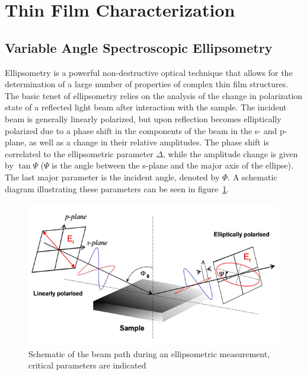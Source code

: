 





\section{Thin Film Characterization}


	
\subsection{Variable Angle Spectroscopic Ellipsometry}

Ellipsometry is a powerful non-destructive optical technique that allows for the determination of a large number of properties of complex thin film structures. The basic tenet of ellipsometry relies on the analysis of the change in polarization state of a reflected light beam after interaction with the sample. The incident beam is generally linearly polarized, but upon reflection becomes elliptically polarized due to a phase shift in the components of the beam in the s- and p-plane, as well as a change in their relative amplitudes. The phase shift is correlated to the ellipsometric parameter $\Delta$, while the amplitude change is given by $\tan\Psi$ ($\Psi$ is the angle between the s-plane and the major axis of the ellipse). The last major parameter is the incident angle, denoted by $\Phi$. A schematic diagram illustrating these parameters can be seen in figure~\ref{fig:ellipsometry}. 

\begin{figure}[tb]
   \centering
   \includegraphics[width=\linewidth]{./figures/characterization/ellipsometryDiagram_simple} 
   \caption[Ellipsometric Beam Path and Modeling Parameters]{Schematic of the beam path during an %
   					ellipsometric measurement, \\ critical parameters are indicated}
   \label{fig:ellipsometry}
\end{figure}

